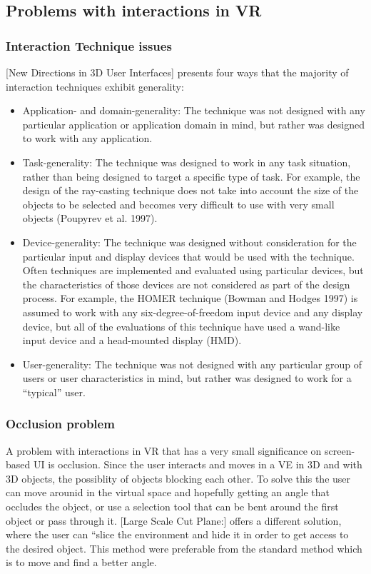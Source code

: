 \subsection{Problems with interactions in VR}

\subsubsection{Interaction Technique issues}
[New Directions in 3D User Interfaces] presents four ways that the majority of interaction techniques exhibit generality:
\begin{itemize}
  \item Application- and domain-generality: The technique was not designed with any particular application or application domain in mind, but rather was designed to work with any application.
  \item Task-generality: The technique was designed to work in any task situation, rather than being designed to target a specific type of task. For example, the design of the ray-casting technique does not take into account the size of the objects to be selected and becomes very difficult to use with very small objects (Poupyrev et al. 1997).
  \item Device-generality: The technique was designed without consideration for the particular input and display devices that would be used with the technique. Often techniques are implemented and evaluated using particular devices, but the characteristics of those devices are not considered as part of the design process. For example, the HOMER technique (Bowman and Hodges 1997) is assumed to work with any six-degree-of-freedom input device and any display device, but all of the evaluations of this technique have used a wand-like input device and a head-mounted display (HMD).
  \item User-generality: The technique was not designed with any particular group of users or user characteristics in mind, but rather was designed to work for a “typical” user.
\end{itemize}

\subsubsection{Occlusion problem}
A problem with interactions in VR that has a very small significance on screen-based UI is occlusion. Since the user interacts and moves in a VE in 3D and with 3D objects, the possiblity of objects blocking each other. To solve this the user can move arounid in the virtual space and hopefully getting an angle that occludes the object, or use a selection tool that can be bent around the first object or pass through it. [Large Scale Cut Plane:] offers a different solution, where the user can “slice the environment and hide it in order to get access to the desired object.
This method were preferable from the standard method which is to move and find a better angle.
